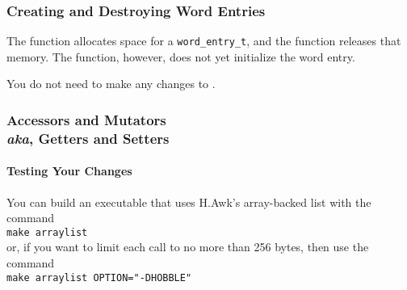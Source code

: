    \subsubsection{Creating and Destroying Word Entries}

        The  function allocates space for a \lstinline{word_entry_t}, and the  function releases that memory.
        The  function, however, does not yet initialize the word entry.

        \begin{description}
        \end{description}

        You do not need to make any changes to .

    \subsubsection{Accessors and Mutators \\ \footnotesize{\textit{aka}, Getters and Setters}}

        \begin{description}
        \end{description}

    \paragraph{Testing Your Changes}

        You can build an executable that uses H.Awk's array-backed list with the command \\
        \verb+make arraylist+ \\
        or, if you want to limit each  call to no more than 256 bytes, then use the command \\
        \verb+make arraylist OPTION="-DHOBBLE"+

